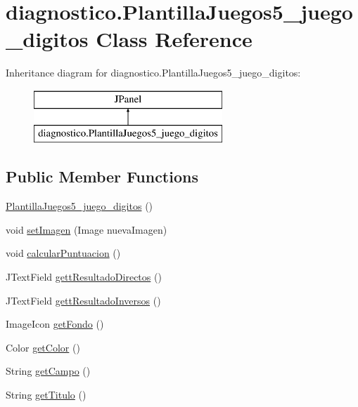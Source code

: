 \hypertarget{classdiagnostico_1_1_plantilla_juegos5__juego__digitos}{}\section{diagnostico.\+Plantilla\+Juegos5\+\_\+juego\+\_\+digitos Class Reference}
\label{classdiagnostico_1_1_plantilla_juegos5__juego__digitos}
Inheritance diagram for diagnostico.\+Plantilla\+Juegos5\+\_\+juego\+\_\+digitos\+:\begin{figure}[H]
\begin{center}
\leavevmode
\includegraphics[height=2.000000cm]{classdiagnostico_1_1_plantilla_juegos5__juego__digitos}
\end{center}
\end{figure}
\subsection*{Public Member Functions}
\begin{DoxyCompactItemize}
\item 
\mbox{\hyperlink{classdiagnostico_1_1_plantilla_juegos5__juego__digitos_a0bd662d6fe36cfcd6217ace0289ac1a2}{Plantilla\+Juegos5\+\_\+juego\+\_\+digitos}} ()
\item 
void \mbox{\hyperlink{classdiagnostico_1_1_plantilla_juegos5__juego__digitos_a67204e3c54995a803ac3103ceaa9f5e9}{set\+Imagen}} (Image nueva\+Imagen)
\item 
void \mbox{\hyperlink{classdiagnostico_1_1_plantilla_juegos5__juego__digitos_a20af1cff94511f4a1f7b01ac6ee67a34}{calcular\+Puntuacion}} ()
\item 
J\+Text\+Field \mbox{\hyperlink{classdiagnostico_1_1_plantilla_juegos5__juego__digitos_a0154f9fcb38d68f07bd4762961c30878}{gett\+Resultado\+Directos}} ()
\item 
J\+Text\+Field \mbox{\hyperlink{classdiagnostico_1_1_plantilla_juegos5__juego__digitos_a2312797ddd1bc2c8052dbfe3b0f4f35e}{gett\+Resultado\+Inversos}} ()
\item 
Image\+Icon \mbox{\hyperlink{classdiagnostico_1_1_plantilla_juegos5__juego__digitos_a0a2fcf594c9644132b90bc51468b78f0}{get\+Fondo}} ()
\item 
Color \mbox{\hyperlink{classdiagnostico_1_1_plantilla_juegos5__juego__digitos_a74a0d068d7131dea1b4dafcab4ef123d}{get\+Color}} ()
\item 
String \mbox{\hyperlink{classdiagnostico_1_1_plantilla_juegos5__juego__digitos_a1b02416d416cec99c5a8cda99bf73455}{get\+Campo}} ()
\item 
String \mbox{\hyperlink{classdiagnostico_1_1_plantilla_juegos5__juego__digitos_a3d56081784d8a77b3e032617e87baf84}{get\+Titulo}} ()
\end{DoxyCompactItemize}
